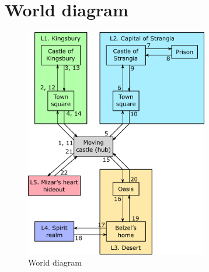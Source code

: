 \section{World diagram}
\begin{figure}[H]
  \centering
  \includegraphics[width=8cm]{Images/worldDiagram}
  \caption{World diagram}
\end{figure}
